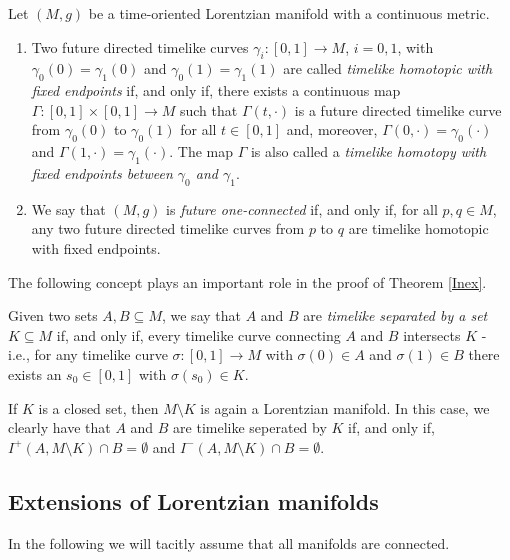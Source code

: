 \documentclass[reqno]{article}
\begin{document}
\begin{definition}
Let $(M,g)$ be a time-oriented Lorentzian manifold with a continuous metric. 
\begin{enumerate}
\item Two future directed timelike curves $\gamma_i : [0,1] \to M$, $i = 0,1$, with $\gamma_0(0) = \gamma_1(0)$ and $\gamma_0(1) = \gamma_1(1)$ are called \emph{timelike homotopic with fixed endpoints} if, and only if, there exists a continuous map $\Gamma : [0,1] \times [0,1] \to M$ such that $\Gamma(t, \cdot)$ is a future directed timelike curve from $\gamma_0(0)$ to $\gamma_0(1)$ for all $t \in [0,1]$  and, moreover, $\Gamma(0, \cdot) = \gamma_0(\cdot)$ and $\Gamma(1,\cdot) = \gamma_1(\cdot)$. The map $\Gamma$ is also called a \emph{timelike homotopy with fixed endpoints between $\gamma_0$ and $\gamma_1$}.
\item We say that $(M,g)$ is \emph{future one-connected} if, and only if, for all $p, q \in M$, any two future directed timelike curves from $p$ to $q$ are timelike homotopic with fixed endpoints.
\end{enumerate}
\end{definition}

The following concept plays an important role in the proof of Theorem \ref{Inex}.

\begin{definition}
Given two sets $A,B \subseteq M$, we say that $A$ and $B$ are \emph{timelike separated by a set $K \subseteq M$} if, and only if, every timelike curve connecting $A$ and $B$ intersects $K$ - i.e., for any timelike curve $\sigma : [0,1] \to M$ with $\sigma(0) \in A$ and $\sigma(1) \in B$ there exists an $s_0 \in [0,1]$ with $\sigma(s_0) \in K$.
\end{definition}
If $K$ is a closed set, then $M \setminus K$ is again a Lorentzian manifold. In this case, we clearly have that $A$ and $B$ are timelike seperated by $K$ if, and only if, $I^+(A,M\setminus K) \cap B = \emptyset$ and $I^-(A, M \setminus K) \cap B = \emptyset$.





\subsection{Extensions of Lorentzian manifolds}

In the following we will tacitly assume that all manifolds are connected.
\end{document}
